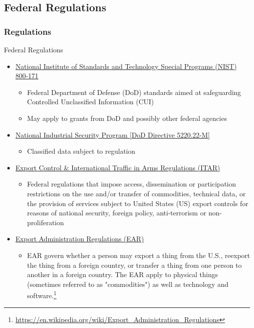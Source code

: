 \subsection{Federal Regulations}
\begin{frame}
  \frametitle{Regulations}
  \vspace{-5pt}
  \begin{block}{Federal Regulations}
    \begin{itemize}
    \item \href{https://csrc.nist.gov/publications/detail/sp/800-171/rev-1/final}{National Institute of Standards and Technology Special Programs (NIST) 800-171}
      \begin{itemize}
      \item Federal Department of Defense (DoD) standards aimed at safeguarding Controlled Unclassified Information (CUI)
      \item May apply to grants from DoD and possibly other federal agencies
      \end{itemize}
    
    \item \href{https://www.hsdl.org/?abstract\&did=461297}{National Industrial Security Program [DoD Directive 5220.22-M]}
      \begin{itemize}
      \item Classified data subject to regulation
      \end{itemize}
      
    \item \href{https://www.pmddtc.state.gov/ddtc_public?id=ddtc_public_portal_itar_landing\#tab-itar}{Export Control \& International Traffic in Arms Regulations (ITAR)}
      \begin{itemize}
      \item Federal regulations that impose access, dissemination or participation restrictions on the use and/or transfer of commodities, technical data, or the provision of services subject to United States (US) export controls for reasons of national security, foreign policy, anti-terrorism or non-proliferation
      \end{itemize}

    \item \href{https://www.bis.doc.gov/index.php/regulations/export-administration-regulations-ear}{Export Administration Regulations (EAR)}
      \begin{itemize}
      \item EAR govern whether a person may export a thing from the U.S., reexport the thing from a foreign country, or transfer a thing from one person to another in a foreign country. The EAR apply to physical things (sometimes referred to as "commodities") as well as technology and software.\footnote{\label{EAR on Wikipedia}\tiny\url{https://en.wikipedia.org/wiki/Export_Administration_Regulations}} 
      \end{itemize}
    \end{itemize}
\end{block}
\end{frame}  


